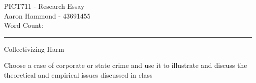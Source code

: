 \documentclass[11pt, a4paper,]{scrartcl}
\begin{document}
\vspace{-2em}
\begin{flushleft}{\footnotesize{}
PICT711 - Research Essay\\
Aaron Hammond - 43691455\\
Word Count:
}
\end{flushleft}

\hrule
\begin{center}
\huge Collectivizing Harm
\end{center}

Choose a case of corporate or state crime and use it to illustrate
and discuss the theoretical and empirical issues discussed in class\par
\end{document}
